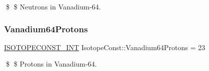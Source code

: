 \$ \$ Neutrons in Vanadium-\/64. \mbox{\label{group___isotope_const-_vanadium-_v64_gaebf12f3da0e0484de50c8ccd6e954303}} 
\subsubsection{\texorpdfstring{Vanadium64\+Protons}{Vanadium64Protons}}
{\footnotesize\ttfamily \mbox{\hyperlink{group___isotope_const-_macros_ga5f18360b3e99483a35c32d789e62621c}{I\+S\+O\+T\+O\+P\+E\+C\+O\+N\+S\+T\+\_\+\+I\+NT}} Isotope\+Const\+::\+Vanadium64\+Protons = 23}

\$ \$ Protons in Vanadium-\/64. 